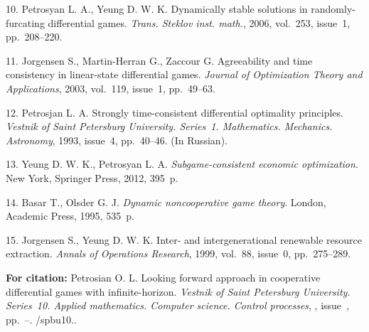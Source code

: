 {10. Petrosyan L. A., Yeung D. W. K. Dynamically stable solutions
in randomly-furcating differential games. \emph{Trans. Steklov
inst. math.}, 2006, vol.~253, issue~1, pp.~208--220.

11. Jorgensen S., Martin-Herran G., Zaccour G. Agreeability and
time consistency in linear-state differential games. \emph{Journal
of Optimization Theory and Applications}, 2003, vol.~119, issue~1,
pp.~49--63.

12. Petrosjan L. A. Strongly time-consistent differential
optimality principles. \emph{Vestnik of Saint Petersburg
University. Series~1. Mathematics. Mechanics. Astronomy}, 1993,
issue~4, pp.~40--46.  (In Russian).

13. Yeung D. W. K., Petrosyan L. A. \emph{Subgame-consistent
economic optimization}. New York, Springer Press, 2012, 395~p.

14. Basar T., Olsder G. J. \emph{Dynamic noncooperative game
theory}. London, Academic Press, 1995, 535~p.

15. Jorgensen S., Yeung D. W. K. Inter- and intergenerational
renewable resource extraction. \emph{Annals of Operations
Research}, 1999, vol.~88, issue~0, pp.~275--289.


\vskip 2mm

{\bf For citation:}  Petrosian O. L. Looking forward approach in
cooperative differential games with infinite-horizon. {\it Vestnik
of Saint Petersburg University. Series~10. Applied mathematics.
Computer science. Control processes}, \issueyear, issue~\issuenum,
pp.~\pageref{p2}--\pageref{p2e}.
\doivyp/spbu10.\issueyear.

}
